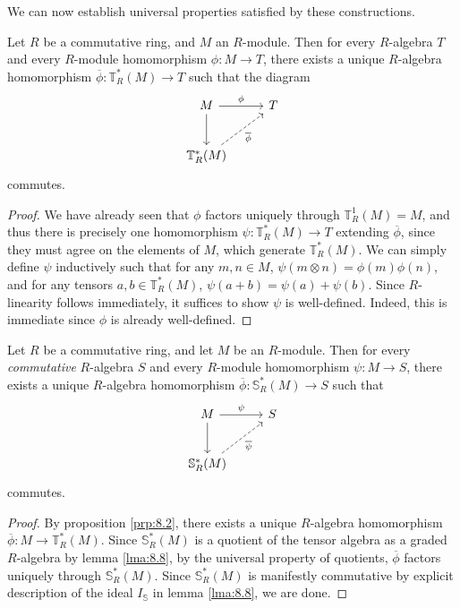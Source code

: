 We can now establish universal properties satisfied by these constructions.
\begin{proposition}\label{prp:8.2}
	Let $R$ be a commutative ring, and $M$ an $R$-module. Then for every $R$-algebra $T$ and every $R$-module homomorphism $\phi : M \to T$, there exists a unique $R$-algebra homomorphism $\overline{\phi } : \mathbb{T}^*_R(M) \to T$ such that the diagram
	\[\begin{tikzcd}[row sep = 2.5em, column sep = 2.5em]
		M\arrow[r, "\phi "]\arrow[d]&T\\
		\mathbb{T}_R^*(M)\arrow[ur, dashed, " \overline{\phi } "']
	\end{tikzcd}\]
	commutes.
\end{proposition}
\begin{proof}
	We have already seen that $\phi $ factors uniquely through $\mathbb{T}_R^1(M)=M$, and thus there is precisely one homomorphism $\psi : \mathbb{T}_R^*(M) \to T$ extending $ \overline{\phi } $, since they must agree on the elements of $M$, which generate $\mathbb{T} _R^*(M)$. We can simply define $\psi $ inductively such that for any $m,n\in M$, $\psi (m\otimes n)=\phi (m)\phi (n)$, and for any tensors $a,b\in\mathbb{T}_R^*(M)$, $\psi (a+b)=\psi (a)+\psi (b)$. Since $R$-linearity follows immediately, it suffices to show $\psi $ is well-defined. Indeed, this is immediate since $\phi $ is already well-defined.
\end{proof}
\begin{proposition}\label{prp:8.3}
	Let $R$ be a commutative ring, and let $M$ be an $R$-module. Then for every \emph{commutative} $R$-algebra $S$ and every $R$-module homomorphism $\psi : M \to S$, there exists a unique $R$-algebra homomorphism $\overline{\phi } : \mathbb{S}_R^*(M) \to S$ such that
	\[\begin{tikzcd}[row sep = 2.5em, column sep = 2.5em]
		M\arrow[r, "\psi "]\arrow[d]&S\\
		\mathbb{S}_R^*(M)\arrow[ur, dashed, " \overline{\psi } "']
	\end{tikzcd}\]
	commutes.
\end{proposition}
\begin{proof}
	By proposition \ref{prp:8.2}, there exists a unique $R$-algebra homomorphism $\overline{\phi } :M\to \mathbb{T}_R^*(M)$. Since $\mathbb{S}_R^*(M)$ is a quotient of the tensor algebra as a graded $R$-algebra by lemma \ref{lma:8.8}, by the universal property of quotients, $\overline{\phi } $ factors uniquely through $\mathbb{S}_R^*(M)$. Since $\mathbb{S}_R^*(M)$ is manifestly commutative by explicit description of the ideal $I_\mathbb{S} $ in lemma \ref{lma:8.8}, we are done.
\end{proof}
